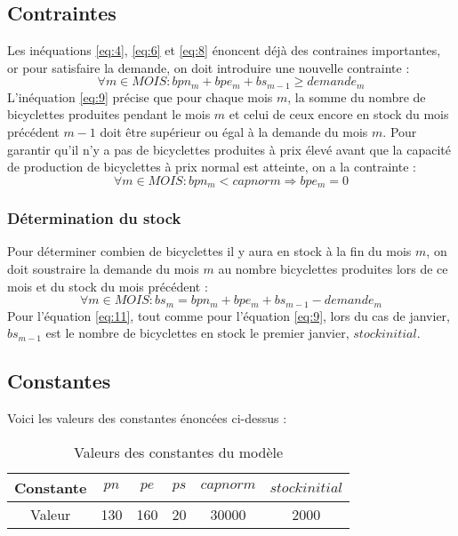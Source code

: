 \documentclass[11pt,a4paper]{report}
\begin{document}
\subsection*{Contraintes}
Les inéquations \eqref{eq:4}, \eqref{eq:6} et \eqref{eq:8} énoncent déjà des contraines importantes, or pour satisfaire la demande, on doit introduire une nouvelle contrainte :
\begin{equation}\label{eq:9}
\forall m \in MOIS : bpn_{m}+bpe_{m}+bs_{m-1}\geq demande_{m}
\end{equation}
L'inéquation \eqref{eq:9} précise que pour chaque mois $m$, la somme du nombre de bicyclettes produites pendant le mois $m$ et celui de ceux encore en stock du mois précédent $m-1$ doit être supérieur ou égal à la demande du mois $m$.\newline
Pour garantir qu'il n'y a pas de bicyclettes produites à prix élevé avant que la capacité de production de bicyclettes à prix normal est atteinte, on a la contrainte : 
\begin{equation}\label{eq:10}
\forall m \in MOIS : bpn_{m} < capnorm \Rightarrow bpe_{m}=0  
\end{equation}
\subsubsection*{Détermination du stock}
Pour déterminer combien de bicyclettes il y aura en stock à la fin du mois $m$, on doit soustraire la demande du mois $m$ au nombre bicyclettes produites lors de ce mois et du stock du mois précédent :
\begin{equation}\label{eq:11}
\forall m \in MOIS : bs_{m}=bpn_{m}+bpe_{m}+bs_{m-1}-demande_{m}
\end{equation}
Pour l'équation \eqref{eq:11}, tout comme pour l'équation \eqref{eq:9}, lors du cas de janvier, $bs_{m-1}$ est le nombre de bicyclettes en stock le premier janvier, $stockinitial$.
\subsection*{Constantes}
Voici les valeurs des constantes énoncées ci-dessus :
\begin{table}[h]
\centering
\caption{Valeurs des constantes du modèle}
\begin{tabular}{ |c |c| c| c| c| c|}
\hline
 Constante  & $pn$ & $pe$ & $ps$ & $capnorm$ & $stockinitial$ \\  
 \hline
 Valeur & 130 & 160 & 20 & 30000 & 2000  \\
 \hline
\end{tabular}
\end{table}
\end{document}
